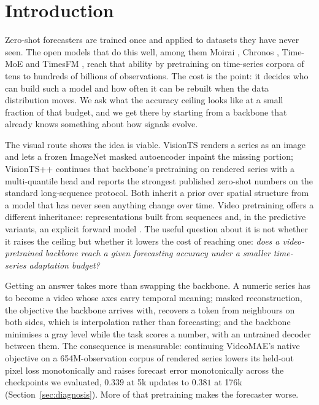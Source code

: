 \section{Introduction}
\label{sec:intro}

Zero-shot forecasters are trained once and applied to datasets they have never seen. The open models
that do this well, among them Moirai \citep{moirai}, Chronos \citep{chronos}, Time-MoE
\citep{timemoe} and TimesFM \citep{timesfm}, reach that ability by pretraining on time-series corpora of tens to
hundreds of billions of observations. The cost is the point: it decides who can build such a model
and how often it can be rebuilt when the data distribution moves. We ask what the accuracy ceiling
looks like at a small fraction of that budget, and we get there by starting from a backbone that
already knows something about how signals evolve.

The visual route shows the idea is viable. VisionTS \citep{visionts} renders a series as an image and
lets a frozen ImageNet masked autoencoder \citep{mae} inpaint the missing portion; VisionTS++
\citep{visiontspp} continues that backbone's pretraining on rendered series with a multi-quantile
head and reports the strongest published zero-shot numbers on the standard long-sequence protocol.
Both inherit a prior over spatial structure from a model that has never seen anything change over
time. Video pretraining offers a different inheritance: representations built from sequences and, in the
predictive variants, an explicit forward model \citep{videomae, vjepa2}. The useful question about
it is not whether it raises the ceiling but whether it lowers the cost of reaching one: \emph{does a video-pretrained backbone reach a given forecasting accuracy under a smaller
time-series adaptation budget?}

Getting an answer takes more than swapping the backbone. A numeric series has to become a video whose
axes carry temporal meaning; masked reconstruction, the objective the backbone arrives with, recovers
a token from neighbours on both sides, which is interpolation rather than forecasting; and the
backbone minimises a gray level while the task scores a number, with an untrained decoder between
them. The consequence is measurable: continuing VideoMAE's native objective on a 654M-observation
corpus of rendered series lowers its held-out pixel loss monotonically and raises forecast error
monotonically across the checkpoints we evaluated, $0.339$ at 5k updates to $0.381$ at 176k
(Section~\ref{sec:diagnosis}). More of that pretraining makes the forecaster worse.

